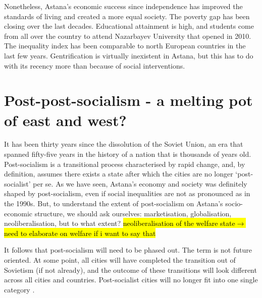 \documentclass{article}
\begin{document}
Nonetheless, Astana's economic success since independence has improved the standards of living and created a more equal society. The poverty gap has been closing over the last decades. Educational attainment is high, and students come from all over the country to attend Nazarbayev University that opened in 2010. The inequality index has been comparable to north European countries in the last few years. Gentrification is virtually inexistent in Astana, but this has to do with its recency more than because of social interventions.

\section{Post-post-socialism - a melting pot of east and west?}



It has been thirty years since the dissolution of the Soviet Union, an era that spanned fifty-five years in the history of a nation that is thousands of years old. Post-socialism is a transitional process characterised by rapid change, and, by definition, assumes there exists a state after which the cities are no longer `post-socialist' per se. 
As we have seen, Astana's economy and society was definitely shaped by post-socialism, even if social inequalities are not as pronounced as in the 1990s. But, to understand the extent of post-socialism on Astana's socio-economic structure, we should ask ourselves: marketisation, globalisation, neoliberalisation, but to what extent? \hl{neoliberalisation of the welfare state$\rightarrow$ need to elaborate on welfare if i want to say that}

It follows that post-socialism will need to be phased out. The term is not future oriented. At some point, all cities will have completed the transition out of Sovietism (if not already), and the outcome of these transitions will look different across all cities and countries. Post-socialist cities will no longer fit into one single category \parencite{hirt2016conceptual}.
\end{document}
